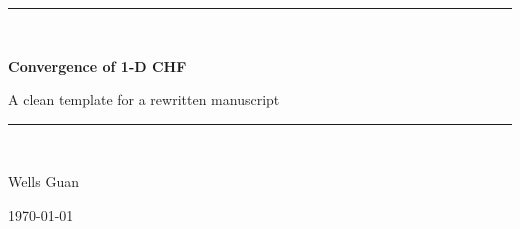 \documentclass[11pt]{article}
\numberwithin{equation}{section}
\theoremstyle{definition}
\theoremstyle{remark}
\begin{document}
\begin{titlepage}
    \centering
    \vspace*{2.2cm}
    {\rule{\linewidth}{1.2pt}}\\[0.8cm]
    {\Huge\bfseries Convergence of 1-D CHF\par}
    \vspace{0.5cm}
    {\Large A clean template for a rewritten manuscript\par}
    \vspace{0.8cm}
    {\rule{\linewidth}{1.2pt}}\\[2.5cm]
    {\Large Wells Guan\par}
    \vfill
    {\large \today\par}
\end{titlepage}

\tableofcontents
\newpage






\appendix


\clearpage
{}


\end{document}
